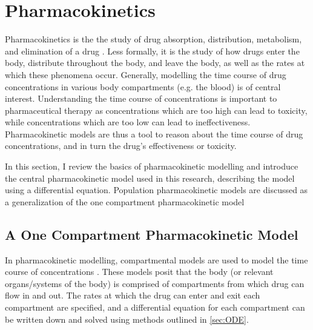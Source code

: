 \section{Pharmacokinetics} \label{PKPD}

Pharmacokinetics is the the study of drug absorption, distribution, metabolism, and elimination of a drug \cite{rosenbaum2016basic}.  Less formally,  it is the study of how drugs enter the body, distribute throughout the body, and leave the body, as well as the rates at which these phenomena occur.  Generally, modelling the time course of drug concentrations in various body compartments (e.g. the blood) is of central interest.  Understanding the time course of concentrations is important to pharmaceutical therapy as concentrations which are too high can lead to toxicity, while concentrations which are too low can lead to ineffectiveness.  Pharmacokinetic models are thus a tool to reason about the time course of drug concentrations, and in turn the drug's effectiveness or toxicity.

In this section, I review the basics of pharmacokinetic modelling and introduce the central pharmacokinetic model used in this research, describing the model using a differential equation.  Population pharmacokinetic models are discussed as a generalization of the one compartment pharmacokinetic model


\subsection{A One Compartment Pharmacokinetic Model} 

In pharmacokinetic modelling, compartmental models are used to model the time course of concentrations \cite{rosenbaum2016basic}. These models posit that the body (or relevant organs/systems of the body) is comprised of compartments from which drug can flow in and out. The rates at which the drug can enter and exit each compartment are specified, and a differential equation for each compartment can be written down and solved using methods outlined in \cref{sec:ODE}.

